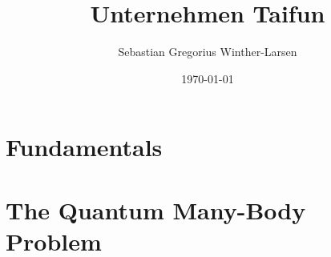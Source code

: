 \documentclass[twoside, english, notitlepage, 10pt]{uiofysmaster}
\author{Sebastian Gregorius Winther-Larsen}
\title{Unternehmen Taifun}
\date{\today}
\begin{document}
\frontmatter
    \maketitle

    \tableofcontents

\mainmatter

    \part{Fundamentals}

        
        

    \part{The Quantum Many-Body Problem}

        

    \appendix

        

        
\printbibliography
\end{document}
